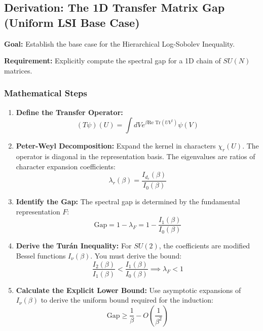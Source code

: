 \subsection{Derivation: The 1D Transfer Matrix Gap (Uniform LSI Base Case)}

\textbf{Goal:} Establish the base case for the Hierarchical Log-Sobolev Inequality.

\textbf{Requirement:} Explicitly compute the spectral gap for a 1D chain of $SU(N)$ matrices.

\subsubsection*{Mathematical Steps}

\begin{enumerate}
    \item \textbf{Define the Transfer Operator:}
    \begin{equation}
        (T \psi)(U) = \int dV e^{\beta \text{Re Tr}(U V^\dagger)} \psi(V)
    \end{equation}

    \item \textbf{Peter-Weyl Decomposition:}
    Expand the kernel in characters $\chi_r(U)$. The operator is diagonal in the representation basis. The eigenvalues are ratios of character expansion coefficients:
    \begin{equation}
        \lambda_r(\beta) = \frac{I_{d_r}(\beta)}{I_0(\beta)}
    \end{equation}

    \item \textbf{Identify the Gap:}
    The spectral gap is determined by the fundamental representation $F$:
    \begin{equation}
        \text{Gap} = 1 - \lambda_F = 1 - \frac{I_1(\beta)}{I_0(\beta)}
    \end{equation}

    \item \textbf{Derive the Turán Inequality:}
    For $SU(2)$, the coefficients are modified Bessel functions $I_\nu(\beta)$. You must derive the bound:
    \begin{equation}
        \frac{I_2(\beta)}{I_1(\beta)} < \frac{I_1(\beta)}{I_0(\beta)} \implies \lambda_{F} < 1
    \end{equation}

    \item \textbf{Calculate the Explicit Lower Bound:}
    Use asymptotic expansions of $I_\nu(\beta)$ to derive the uniform bound required for the induction:
    \begin{equation}
        \text{Gap} \ge \frac{1}{\beta} - O(\frac{1}{\beta^2})
    \end{equation}
\end{enumerate}

